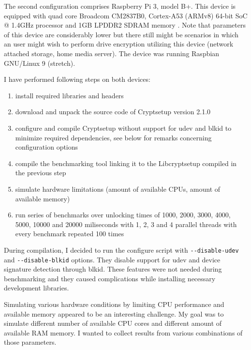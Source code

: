 \documentclass[nolof]{fithesis3}
\begin{document}
The second configuration comprises Raspberry Pi 3, model B+. This device is equipped with quad core Broadcom CM2837B0, Cortex-A53 (ARMv8) 64-bit SoC @ 1.4GHz processor and 1GB LPDDR2 SDRAM memory \parencite{raspberryspecs}. Note that parameters of this device are considerably lower but there still might be scenarios in which an user might wish to perform drive encryption utilizing this device (network attached storage, home media server). The device was running Raspbian GNU/Linux 9 (stretch).

I have performed following steps on both devices:

\begin{enumerate}
\item install required libraries and headers

\item download and unpack the source code of Cryptsetup version 2.1.0

\item configure and compile Cryptsetup without support for udev and blkid to minimize required dependencies, see below for remarks concerning configuration options

\item compile the benchmarking tool linking it to the Libcryptsetup compiled in the previous step

\item simulate hardware limitations (amount of available CPUs, amount of available memory)

\item run series of benchmarks over unlocking times of 1000, 2000, 3000, 4000, 5000, 10000 and 20000 miliseconds with 1, 2, 3 and 4 parallel threads with every benchmark repeated 100 times
\end{enumerate}

During compilation, I decided to run the configure script with \verb+--disable-udev+ and \verb+--disable-blkid+ options. They disable support for udev and device signature detection through blkid. These features were not needed during benchmarking and they caused complications while installing necessary development libraries.

Simulating various hardware conditions by limiting CPU performance and available memory appeared to be an interesting challenge. My goal was to simulate different number of available CPU cores and different amount of available RAM memory. I wanted to collect results from various combinations of those parameters.
\end{document}

